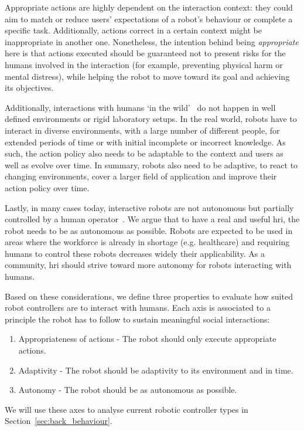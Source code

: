     Appropriate actions are highly dependent on the interaction context: they could aim to match or reduce users' expectations of a robot's behaviour or complete a specific task. Additionally, actions correct in a certain context might be inappropriate in another one. Nonetheless, the intention behind being \textit{appropriate} here is that actions executed should be guaranteed not to present risks for the humans involved in the interaction (for example, preventing physical harm or mental distress), while helping the robot to move toward its goal and achieving its objectives.

    Additionally, interactions with humans `in the wild'~\citep{belpaeme2012multimodal} do not happen in well defined environments or rigid laboratory setups. In the real world, robots have to interact in diverse environments, with a large number of different people, for extended periods of time or with initial incomplete or incorrect knowledge. As such, the action policy also needs to be adaptable to the context and users as well as evolve over time. In summary, robots also need to be adaptive, to react to changing environments, cover a larger field of application and improve their action policy over time.

    Lastly, in many cases today, interactive robots are not autonomous but partially controlled by a human operator~\citep{riek2012wizard}. We argue that to have a real and useful \gls{hri}, the robot needs to be as autonomous as possible. %
    Robots are expected to be used in areas where the workforce is already in shortage (e.g. healthcare) and requiring humans to control these robots decreases widely their applicability. As a community, \gls{hri} should strive toward more autonomy for robots interacting with humans.
    
    Based on these considerations, we define three properties to evaluate how suited robot controllers are to interact with humans. Each axis is associated to a principle the robot has to follow to sustain meaningful social interactions:
    \begin{enumerate}
    	\item Appropriateness of actions - The robot should only execute appropriate actions.
    	\item Adaptivity - The robot should be adaptivity to its environment and in time.
    	\item Autonomy - The robot should be as autonomous as possible.
    \end{enumerate}
    We will use these axes to analyse current robotic controller types in Section~\ref{sec:back_behaviour}.    
    
